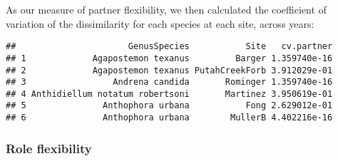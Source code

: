 \documentclass[
]{article}
\newenvironment{Shaded}{\begin{snugshade}}{\end{snugshade}}
\newcommand{\CommentTok}[1]{\textcolor[rgb]{0.56,0.35,0.01}{\textit{#1}}}
\newcommand{\ControlFlowTok}[1]{\textcolor[rgb]{0.13,0.29,0.53}{\textbf{#1}}}
\newcommand{\DataTypeTok}[1]{\textcolor[rgb]{0.13,0.29,0.53}{#1}}
\newcommand{\KeywordTok}[1]{\textcolor[rgb]{0.13,0.29,0.53}{\textbf{#1}}}
\newcommand{\NormalTok}[1]{#1}
\newcommand{\OperatorTok}[1]{\textcolor[rgb]{0.81,0.36,0.00}{\textbf{#1}}}
\newcommand{\OtherTok}[1]{\textcolor[rgb]{0.56,0.35,0.01}{#1}}
\newcommand{\StringTok}[1]{\textcolor[rgb]{0.31,0.60,0.02}{#1}}
\begin{document}
\begin{Shaded}
\end{Shaded}

As our measure of partner flexibility, we then calculated the
coefficient of variation of the dissimilarity for each species at each
site, across years:

\begin{verbatim}
##                      GenusSpecies           Site   cv.partner
## 1             Agapostemon texanus         Barger 1.359740e-16
## 2             Agapostemon texanus PutahCreekForb 3.912029e-01
## 3                 Andrena candida       Rominger 1.359740e-16
## 4 Anthidiellum notatum robertsoni       Martinez 3.950619e-01
## 5               Anthophora urbana           Fong 2.629012e-01
## 6               Anthophora urbana        MullerB 4.402216e-16
\end{verbatim}

\hypertarget{role-flexibility}{%
\subsubsection{Role flexibility}\label{role-flexibility}}
\end{document}
